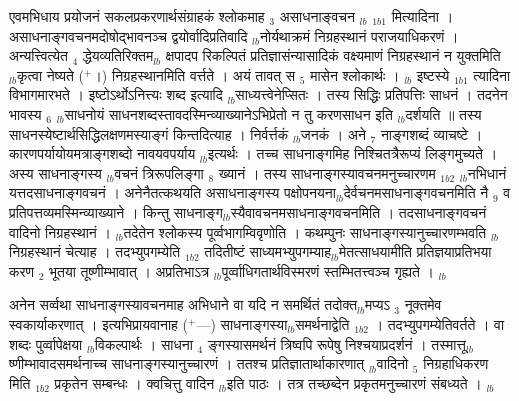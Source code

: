 \documentclass[article,12pt,a4paper]{memoir}%
\newcommand{\add}[1]{($^{+}$#1)}
\newcounter{parCount}
\begin{document}
	  
	  \pstart \leavevmode%
	एवमभिधाय प्रयोजनं सकलप्रकरणार्थसंग्राहकं श्लोकमाह {\tiny $_{3}$} {\color{DodgerBlue3}असाधनाङ्वचन} {\tiny $_{lb}$} {\tiny $_{1b1}$} मित्यादिना । असाधनाङ्गवचनमदोषोद्भावनञ्च द्वयोर्वादिप्रतिवादि {\tiny $_{lb}$}नोर्यथाक्रमं निग्रहस्थानं पराजयाधिकरणं । अन्यत्त्वित्येत {\tiny $_{4}$} द्धेयव्यतिरिक्तम{\tiny $_{lb}$} {\color{DodgerBlue3}क्षपादप} रिकल्पितं प्रतिज्ञासंन्यासादिकं वक्ष्यमाणं निग्रहस्थानं न {\color{DodgerBlue3}युक्तमिति} {\tiny $_{lb}$}कृत्वा {\color{DodgerBlue3}नेष्यते} \add{।} निग्रहस्थानमिति वर्त्तते । अयं तावत् स {\tiny $_{5}$} मासेन श्लोकार्थः । {\tiny $_{lb}$} {\color{DodgerBlue3}इष्टस्ये} {\tiny $_{1b1}$} त्यादिना विभागमारभते । इष्टोऽर्थोऽनित्त्यः शब्द इत्यादि {\tiny $_{lb}$}साध्यत्त्वेनेप्सितः । तस्य {\color{DodgerBlue3}सिद्धिः} प्रतिपत्तिः साधनं । तदनेन भावस्य {\tiny $_{6}$} {\tiny $_{lb}$}साधनोयं साधनशब्दस्तावदस्मिन्व्याख्यानेऽभिप्रेतो न तु करणसाधन इति {\tiny $_{lb}$}दर्शयति ॥ तस्य साधनस्येष्टार्थसिद्धिलक्षणमस्याङ्गं किन्तदित्याह । {\color{DodgerBlue3}निर्वर्त्तकं} {\tiny $_{lb}$}जनकं । अने {\tiny $_{7}$} नाङ्गशब्दं व्याचष्टे । कारणपर्यायोयमत्राङ्गशब्दो नावयवपर्याय {\tiny $_{lb}$}इत्यर्थः । तच्च साधनाङ्गमिह निश्चितत्रैरूप्यं लिङ्गमुच्यते । अस्य साधनाङ्गस्य {\tiny $_{lb}$}वचनं त्रिरूपलिङ्गा {\tiny $_{8}$} ख्यानं । तस्य {\color{DodgerBlue3}साधनाङ्गस्यावचनमनुच्चारणम} {\tiny $_{1b2}$} {\tiny $_{lb}$}नभिधानं यत्तदसाधनाङ्गवचनं । अनेनैतत्कथयति असाधनाङ्गस्य पक्षोपनयना{\tiny $_{lb}$}देर्वचनमसाधनाङ्गवचनमिति नै {\tiny $_{9}$}\leavevmode{} व प्रतिपत्तव्यमस्मिन्व्याख्याने । किन्तु साधनाङ्ग{\tiny $_{lb}$}स्यैवावचनमसाधनाङ्गवचनमिति । तदसाधनाङ्गवचनं वादिनो निग्रहस्थानं । {\tiny $_{lb}$}तदेतेन श्लोकस्य पूर्व्वभागम्विवृणोति । कथम्पुनः साधनाङ्गस्यानुच्चारणम्भवति {\tiny $_{lb}$} {\color{DodgerBlue3}निग्रहस्थानं} चेत्याह । {\color{DodgerBlue3}तदभ्युपगम्येति} {\tiny $_{1b2}$} तदितीष्टं साध्यमभ्युपगम्याह{\tiny $_{lb}$}मेतत्साधयामीति प्रतिज्ञयाप्रतिभया करण {\tiny $_{2}$} भूतया तूष्णीम्भावात् । अप्रतिभाऽत्र {\tiny $_{lb}$}पूर्व्वाधिगतार्थविस्मरणं स्तम्भितत्त्वञ्च गृह्यते ।
	{}
	\pend%
      {\tiny $_{lb}$}

	  
	  \pstart \leavevmode%
	अनेन सर्व्वथा साधनाङ्गस्यावचनमाह अभिधाने वा यदि न समर्थितं तदोक्त{\tiny $_{lb}$}मप्यऽ {\tiny $_{3}$} नूक्तमेव स्वकार्याकरणात् । इत्यभिप्रायवानाह \add{—} {\color{DodgerBlue3}साधनाङ्गस्या{\tiny $_{lb}$}समर्थनाद्वेति} {\tiny $_{1b2}$} । तदभ्युपगम्येतिवर्तते । वा शब्दः पुर्व्वापेक्षया {\tiny $_{lb}$}विकल्पार्थः । साधना {\tiny $_{4}$} ङ्गस्यासमर्थनं त्रिष्वपि रूपेषु निश्चयाप्रदर्शनं । तस्मात्तू{\tiny $_{lb}$}ष्णीम्भावादसमर्थनाच्च साधनाङ्गस्यानुच्चारणं । ततश्च प्रतिज्ञातार्थाकारणात् {\tiny $_{lb}$}वादिनो {\tiny $_{5}$} {\color{DodgerBlue3}निग्रहाधिकरण} मिति {\tiny $_{1b2}$} प्रकृतेन सम्बन्धः । क्वचित्तु {\color{DodgerBlue3}वादिन} {\tiny $_{lb}$}इति पाठः । तत्र तच्छब्देन प्रकृतमनुच्चारणं संबध्यते ।
	{}
	\pend%
      {\tiny $_{lb}$}
\end{document}
